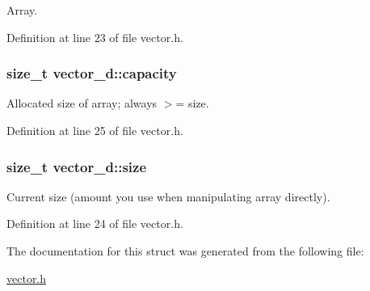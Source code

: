 \-Array. 



\-Definition at line 23 of file vector.\-h.

\hypertarget{structvector__d_a83fb5c9689de179f0dfe1413d720cdc3}{
\subsubsection[{capacity}]{\setlength{\rightskip}{0pt plus 5cm}size\-\_\-t {\bf vector\-\_\-d\-::capacity}}}\label{structvector__d_a83fb5c9689de179f0dfe1413d720cdc3}


\-Allocated size of array; always $>$= size. 



\-Definition at line 25 of file vector.\-h.

\hypertarget{structvector__d_a1a8bccf26d9cef41fd453f6feb2f15b1}{
\subsubsection[{size}]{\setlength{\rightskip}{0pt plus 5cm}size\-\_\-t {\bf vector\-\_\-d\-::size}}}\label{structvector__d_a1a8bccf26d9cef41fd453f6feb2f15b1}


\-Current size (amount you use when manipulating array directly). 



\-Definition at line 24 of file vector.\-h.



\-The documentation for this struct was generated from the following file\-:\begin{DoxyCompactItemize}
\item 
\hyperlink{vector_8h}{vector.\-h}\end{DoxyCompactItemize}
